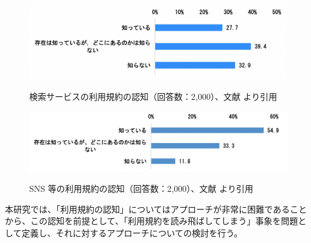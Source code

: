 \begin{figure}[h]
  \begin{center}
      \includegraphics[width=13cm]{img/searchtosninchi.png}
      \caption{検索サービスの利用規約の認知（回答数：2,000）、文献\cite{jftc2021} より引用}
      \label{img:searchtosninchi}
      \includegraphics[width=13cm]{img/snstosninchi.png}
      \caption{SNS 等の利用規約の認知（回答数：2,000）、文献\cite{jftc2021}  より引用}
      \label{img:snstosninchi}
  \end{center}
\end{figure}

本研究では、「利用規約の認知」についてはアプローチが非常に困難であることから、この認知を前提として、「利用規約を読み飛ばしてしまう」事象を問題として定義し、それに対するアプローチについての検討を行う。

